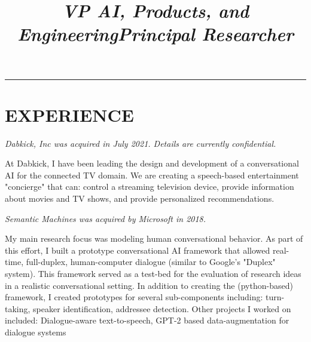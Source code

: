 \documentclass[11pt]{res} %
\newcommand{\mysection}[1]{%
	\pagebreak[0]\section{#1}\vspace{1em}
}
\newenvironment{indentedblock*}[1][\parindent]
  {%
    \par
    \medskip
    \leftskip#1\relax
  }
  {%
    \par
    \medskip
  }
\begin{document}
\nocite{*}


\address{wooters@hey.com}

\begin{resume}

\vspace{2em}
\hrule

\mysection{EXPERIENCE}

\title{{\sl VP AI, Products, and Engineering}}
\begin{position}

\vspace{-.4in}

\begin{indentedblock*}[.1in]
{\sl Dabkick, Inc was acquired in July 2021. Details are currently confidential.}

At Dabkick, I have been leading the design and development of a conversational AI
for the connected TV domain. We are creating a speech-based entertainment
"concierge" that can: control a streaming television device, provide information
about movies and TV shows, and provide personalized recommendations.
\end{indentedblock*}

\end{position}



\title{{\sl Principal Researcher}}
\begin{position}

\vspace{-.4in}

\begin{indentedblock*}[.1in]

{\sl Semantic Machines was acquired by Microsoft in 2018.}

My main research focus was modeling human conversational behavior. As part of this effort, I built a prototype conversational AI framework that allowed real-time, full-duplex, human-computer dialogue (similar to Google's "Duplex" system). This framework served as a test-bed for the evaluation of research ideas in a realistic conversational setting. In addition to creating the (python-based) framework, I created prototypes  for several sub-components including: turn-taking, speaker identification, addressee detection. Other projects I worked on included: Dialogue-aware text-to-speech, GPT-2 based data-augmentation for dialogue systems


\end{indentedblock*}
\end{position}
\end{resume}
\end{document}
